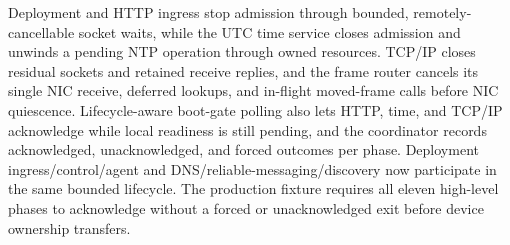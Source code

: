 \begin{itemize}
        Deployment and HTTP ingress stop admission through bounded,
        remotely-cancellable socket waits, while the UTC time service closes
        admission and unwinds a pending NTP operation through owned resources.
        TCP/IP closes residual sockets and retained receive replies, and the
        frame router cancels its single NIC receive, deferred lookups, and
        in-flight moved-frame calls before NIC quiescence.
        Lifecycle-aware boot-gate polling also lets HTTP, time, and TCP/IP
        acknowledge while local readiness is still pending, and the coordinator
        records acknowledged, unacknowledged, and forced outcomes per phase.
        Deployment ingress/control/agent and DNS/reliable-messaging/discovery
        now participate in the same bounded lifecycle. The production fixture
        requires all eleven high-level phases to acknowledge without a forced
        or unacknowledged exit before device ownership transfers.
        

\end{itemize}

